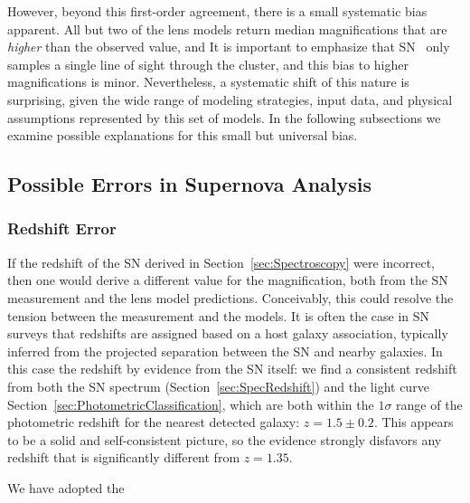However, beyond this first-order agreement, there is a small
systematic bias apparent. All but two of the lens models
return median magnifications that are {\it higher} than the observed
value, and 
It is important to emphasize that SN \tomas\ only samples a single
line of sight through the cluster, and this bias to higher
magnifications is minor.  Nevertheless, a systematic
shift of this nature is surprising, given the wide range of
modeling strategies, input data, and physical assumptions represented
by this set of models.  In the following subsections we examine
possible explanations for this small but  universal
bias.  



\subsection{Possible Errors in Supernova Analysis}
\label{sec:SupernovaError}

\subsubsection{Redshift Error}
\label{sec:RedshiftError}

If the redshift of the SN derived in Section~\ref{sec:Spectroscopy}
were incorrect, then one would derive a different value for the
magnification, both from the SN measurement and the lens model
predictions.  Conceivably, this could resolve the tension between the
measurement and the models.  It is often the case in SN surveys that
redshifts are assigned based on a host galaxy association, typically
inferred from the projected separation between the SN and nearby
galaxies.  In this case the redshift  by
evidence from the SN
itself: we find a consistent redshift from both the SN spectrum
(Section~\ref{sec:SpecRedshift}) and the light curve
Section~\ref{sec:PhotometricClassification}, which are both within the
$1\sigma$ range of the photometric redshift for the nearest detected
galaxy: $z=1.5\pm0.2$. This appears to be a solid and self-consistent
picture, so the evidence strongly disfavors any redshift that is
significantly different from $z=1.35$.

We have adopted the 


